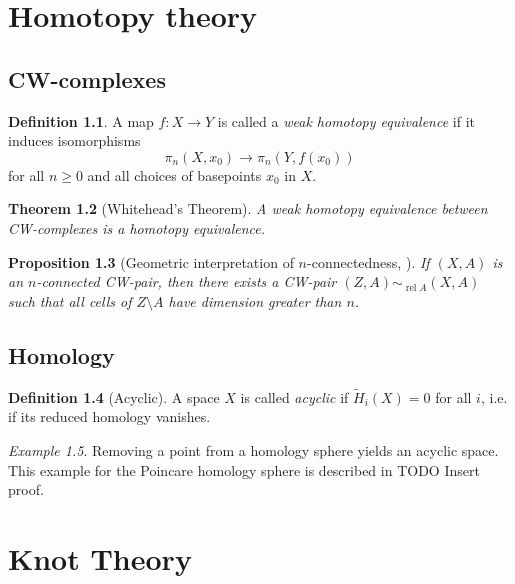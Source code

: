 \documentclass[a4paper]{book}
\newtheorem{theorem}{Theorem}[section]
\newtheorem{proposition}[theorem]{Proposition}
\theoremstyle{definition}
\newtheorem{definition}[theorem]{Definition}
\theoremstyle{remark}
\theoremstyle{example}
\newtheorem{example}[theorem]{Example}
\DeclareMathOperator{\rel}{rel}
\begin{document}
\chapter{Homotopy theory}

\section{CW-complexes}

\begin{definition}
	A map $f \colon X \rightarrow Y$ is called a
	\textit{weak homotopy equivalence} 
	if it induces isomorphisms
	\[
		\pi_n(X, x_0) \rightarrow \pi_n(Y, f(x_0))
	\]
	for all $n \ge 0$ and all choices of basepoints $x_0$ in $X$.
\end{definition}

\begin{theorem}[Whitehead's Theorem]
	A weak homotopy equivalence between CW-complexes is a homotopy equivalence.
\end{theorem}

\begin{proposition}[Geometric interpretation of $n$-connectedness, {\cite[Proposition 4.15]{hatcher2002algebraic}}]
	If $(X, A)$ is an $n$-connected CW-pair, then there exists
	a CW-pair $(Z, A) \sim_{\rel A} (X, A)$
	such that all cells of $Z \setminus A$ have dimension greater than $n$.
\end{proposition}

\section{Homology}

\begin{definition}[Acyclic]
	A space $X$ is called \textit{acyclic} if $\widetilde{H}_{i}(X) = 0$ for all $i$,
	i.e. if its reduced homology vanishes.
\end{definition}

\begin{example}
	Removing a point from a homology sphere yields an acyclic space.
	This example for the Poincare homology sphere is described in
	\cite[Example 2.38]{hatcher2002algebraic}
	TODO Insert proof. %
\end{example}


\chapter{Knot Theory}
\end{document}

